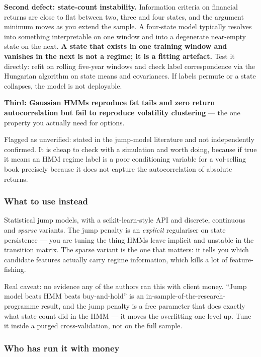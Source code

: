 \documentclass[11pt,a4paper]{article}
\newcommand{\srcnote}[1]{{\footnotesize\color{soft}#1\par}}
\begin{document}
\textbf{Second defect: state-count instability.} Information criteria on financial
returns are close to flat between two, three and four states, and the argument
minimum moves as you extend the sample. A four-state model typically resolves into
something interpretable on one window and into a degenerate near-empty state on the
next. \textbf{A state that exists in one training window and vanishes in the next
is not a regime; it is a fitting artefact.} Test it directly: refit on rolling
five-year windows and check label correspondence via the Hungarian algorithm on
state means and covariances. If labels permute or a state collapses, the model is
not deployable.

\textbf{Third: Gaussian HMMs reproduce fat tails and zero return autocorrelation
but fail to reproduce volatility clustering} --- the one property you actually
need for options. \srcnote{Flagged as unverified: stated in the jump-model
literature and not independently confirmed. It is cheap to check with a simulation
and worth doing, because if true it means an HMM regime label is a poor
conditioning variable for a vol-selling book precisely because it does not capture
the autocorrelation of absolute returns.}

\subsubsection{What to use instead}

Statistical jump models, with a scikit-learn-style API and discrete, continuous and
\emph{sparse} variants. The jump penalty is an \emph{explicit} regulariser on state
persistence --- you are tuning the thing HMMs leave implicit and unstable in the
transition matrix. The sparse variant is the one that matters: it tells you which
candidate features actually carry regime information, which kills a lot of
feature-fishing.

\srcnote{Real caveat: no evidence any of the authors ran this with client money.
``Jump model beats HMM beats buy-and-hold'' is an in-sample-of-the-research-programme
result, and the jump penalty is a free parameter that does exactly what state count
did in the HMM --- it moves the overfitting one level up. Tune it inside a purged
cross-validation, not on the full sample.}

\subsubsection{Who has run it with money}
\end{document}
